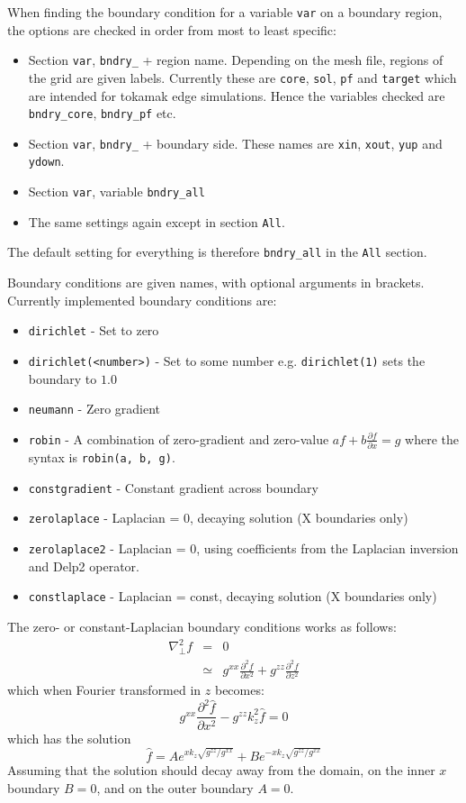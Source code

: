 \documentclass[12pt]{article}
\newcommand{\code}[1]{\texttt{#1}}
\newcommand{\deriv}[2]{\ensuremath{\frac{\partial #1}{\partial #2}}}
\begin{document}
When finding the boundary condition for a variable \code{var} on a boundary region, 
the options are checked in order from most to least specific:
\begin{itemize}
\item Section \code{var}, \code{bndry\_} + region name. Depending on the mesh file, regions
  of the grid are given labels. Currently
  these are \code{core}, \code{sol}, \code{pf} and \code{target} which
  are intended for tokamak edge simulations. Hence the variables checked
  are \code{bndry\_core}, \code{bndry\_pf} etc.
\item Section \code{var}, \code{bndry\_} + boundary side. These names are
  \code{xin}, \code{xout}, \code{yup} and \code{ydown}. 
\item Section \code{var}, variable \code{bndry\_all}
\item The same settings again except in section \code{All}.
\end{itemize}
The default setting for everything is therefore \code{bndry\_all}
in the \code{All} section.

Boundary conditions are given names, with optional arguments in brackets. 
Currently implemented boundary conditions are:
\begin{itemize}
\item \code{dirichlet} - Set to zero
\item \code{dirichlet(<number>)} - Set to some number e.g. \code{dirichlet(1)}
sets the boundary to $1.0$
\item \code{neumann} - Zero gradient
\item \code{robin} - A combination of zero-gradient and zero-value $a f + b\deriv{f}{x} = g$
  where the syntax is \code{robin(a, b, g)}.
\item \code{constgradient} - Constant gradient across boundary

\item \code{zerolaplace} - Laplacian = 0, decaying solution (X boundaries only)
\item \code{zerolaplace2} - Laplacian = 0, using coefficients from the Laplacian inversion
  and Delp2 operator.
\item \code{constlaplace} - Laplacian = const, decaying solution (X boundaries only)
\end{itemize}
The zero- or constant-Laplacian boundary conditions works as follows:
\begin{eqnarray*}
\nabla_\perp^2 f &=& 0 \\
&\simeq& g^{xx}\frac{\partial^2 f}{\partial x^2} + g^{zz}\frac{\partial^2 f}{\partial z^2}
\end{eqnarray*}
which when Fourier transformed in $z$ becomes: 
\[
g^{xx}\frac{\partial^2 \hat{f}}{\partial x^2} - g^{zz}k_z^2 \hat{f} = 0
\]
which has the solution
\[
\hat{f} = Ae^{xk_z\sqrt{g^{zz}/g^{xx}}} + Be^{-xk_z\sqrt{g^{zz}/g^{xx}}}
\]
Assuming that the solution should decay away from the domain, on the inner
$x$ boundary $B = 0$, and on the outer boundary $A = 0$. 
\end{document}
